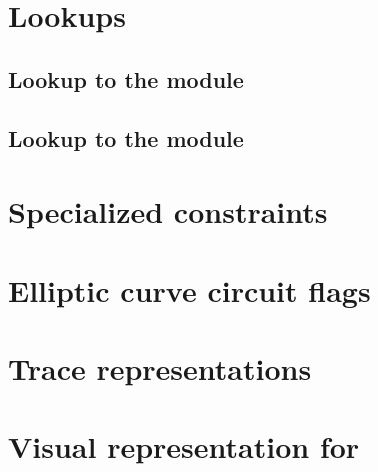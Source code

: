 \section{Lookups}
\subsection{Lookup to the \wcpMod{} module}                                 \label{ec data: lookups: wcp}                                       
\subsection{Lookup to the \extMod{} module}                                 \label{ec data: lookups: ext}                                       

\section{Specialized constraints}                                           \label{ec data: specialized constraints}                            

\section{Elliptic curve circuit flags}                                      \label{ec data: circuits}                                           

\newpage
\section{Trace representations}                                             \label{ec data: trace representations}                              
\section{Visual representation for \instEcpairing{}}                        \label{ec data: visual representation of ecpairing}                 
